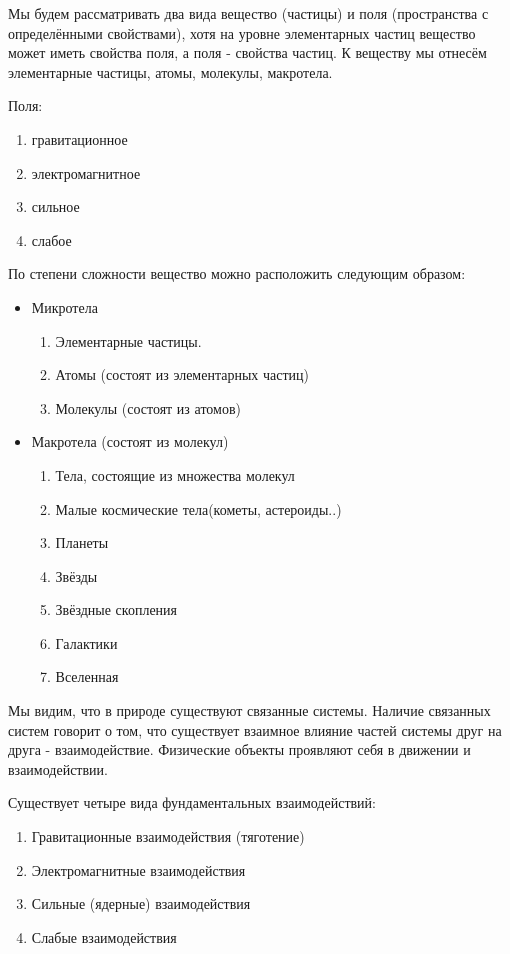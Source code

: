 \documentclass[a5paper, 10pt]{diss_4}
\renewcommand{\'}{\,'}
\begin{document}
 Мы будем рассматривать два вида вещество (частицы) и поля (пространства с
определёнными свойствами), хотя на уровне элементарных частиц вещество может
иметь свойства поля, а поля - свойства частиц. К веществу мы отнесём
элементарные частицы, атомы, молекулы, макротела.

Поля:
\begin{enumerate}
  \item гравитационное
  \item электромагнитное
  \item сильное
  \item слабое
\end{enumerate}

По степени сложности вещество можно расположить следующим образом:

\begin{itemize}
  \item {Микротела
  \begin{enumerate}
  \item Элементарные частицы.
  \item Атомы (состоят из элементарных частиц)
  \item Молекулы (состоят из атомов)
  \end{enumerate}
  }
  \item{ Макротела (состоят из молекул)
  \begin{enumerate}
  \item Тела, состоящие из множества молекул
  \item Малые космические тела(кометы, астероиды..)
  \item Планеты
  \item Звёзды
  \item Звёздные скопления
  \item Галактики
  \item Вселенная
  \end{enumerate}
  }
\end{itemize}

 Мы видим, что в природе существуют связанные системы. Наличие связанных
систем говорит о том, что существует взаимное влияние частей системы друг на
друга - взаимодействие. Физические объекты проявляют себя в движении и
взаимодействии.

 Существует четыре вида фундаментальных взаимодействий:

\begin{enumerate}
  \item Гравитационные взаимодействия (тяготение)
  \item Электромагнитные взаимодействия
  \item Сильные (ядерные) взаимодействия
  \item Слабые взаимодействия
\end{enumerate}
\end{document}
